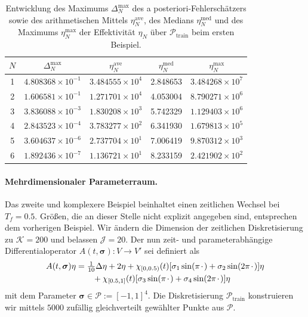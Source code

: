 \documentclass[../main.tex]{subfiles}
\begin{document}
\begin{table}[tb]
    \centering
    \begin{tabular}{|c|c|c|c|c|}\hline
     $N$ & $\Delta_{N}^{\mathrm{max}}$ & $\eta_{N}^{\mathrm{ave}}$ & $\eta_{N}^{\mathrm{med}}$ & $\eta_{N}^{\mathrm{max}}$\\ \hline
     1 & $4.808368{\times}10^{-1}$ & $3.484555{\times}10^{4}$ &  2.848653  & $3.484268{\times}10^{7}$ \\ %
     2 & $1.606581{\times}10^{-1}$ & $1.271701{\times}10^{4}$ &  4.053004  & $8.790271{\times}10^{6}$ \\ %
     3 & $3.836088{\times}10^{-3}$ & $1.830208{\times}10^{3}$ &  5.742329  & $1.129403{\times}10^{6}$ \\ %
     4 & $2.843523{\times}10^{-4}$ & $3.783277{\times}10^{2}$ &  6.341930  & $1.679813{\times}10^{5}$ \\ %
     5 & $3.604637{\times}10^{-6}$ & $2.737704{\times}10^{1}$ &  7.006419  & $9.870312{\times}10^{3}$ \\ %
     6 & $1.892436{\times}10^{-7}$ & $1.136721{\times}10^{1}$ &  8.233159  & $2.421902{\times}10^{2}$ \\ \hline
    \end{tabular}
    \caption[Entwicklung der relevanten Größen der RB"=Methode, erstes Beispiel.]{%
        Entwicklung des Maximums $\Delta_{N}^{\mathrm{max}}$ des a posteriori-Fehlerschätzers sowie des arithmetischen Mittels $\eta_{N}^{\mathrm{ave}}$, des Medians $\eta_{N}^{\mathrm{med}}$ und des Maximums $\eta_{N}^{\mathrm{max}}$ der Effektivität $\eta_{N}$ über $\mathcal P_{\mathrm{train}}$ beim ersten Beispiel.
    }
    \label{table:entwicklung_rbm}
\end{table}

\paragraph{Mehrdimensionaler Parameterraum.} %

Das zweite und komplexere Beispiel beinhaltet einen zeitlichen Wechsel bei $T_f = 0.5$.
Größen, die an dieser Stelle nicht explizit angegeben sind, entsprechen dem vorherigen Beispiel.
Wir ändern die Dimension der zeitlichen Diskretisierung zu $\mathcal K = 200$ und belassen $\mathcal J = 20$.
Der nun zeit- und parameterabhängige Differentialoperator $A(t, \bm \sigma) \colon V \to V'$ sei definiert als
\begin{equation}
    \begin{aligned}
    A(t, \bm \sigma) \eta &=
        \tfrac{1}{10} \Delta \eta + 2 \eta + \chi_{[0, 0.5)}(t) [\sigma_1 \sin(\pi {\mkern2mu\cdot\mkern2mu}) + \sigma_2 \sin(2 \pi {\mkern2mu\cdot\mkern2mu})] \eta \\
        &\qquad + \chi_{[0.5, 1]}(t) [\sigma_3 \sin(\pi {\mkern2mu\cdot\mkern2mu}) + \sigma_4 \sin(2 \pi {\mkern2mu\cdot\mkern2mu})] \eta
    \end{aligned}
\end{equation}
mit dem Parameter $\bm \sigma \in \mathcal P := [-1, 1]^{4}$.
Die Diskretisierung $\mathcal P_{\mathrm{train}}$ konstruieren wir mittels $5000$ zufällig gleichverteilt gewählter Punkte aus $\mathcal P$.
\end{document}
